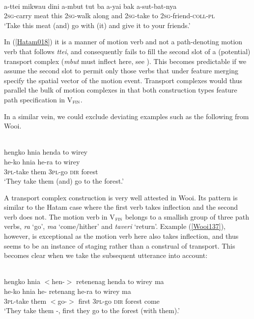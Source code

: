 \ea \label{Hatam018}
\\
\gll a-ttei mikwau dini a-mbut tut ba a-yai bak a-sut-bat-nya \\
\textsc{2}\textsc{sg}-carry meat this \textsc{2}\textsc{sg}-walk along and \textsc{2}\textsc{sg}-take to \textsc{2}\textsc{sg}-friend-\textsc{coll}-\textsc{pl} \\
\glft `Take this meat (and) go with (it) and give it to your friends.'\\ 
\z

In (\ref{Hatam018}) it is a manner of motion verb and not a path-denoting motion verb that follows \textit{ttei}, and consequently fails to fill the second slot of a (potential) transport complex (\textit{mbut} must inflect here, see \citealt[100]{reesink1999grammar}). This becomes predictable if we assume the second slot to permit only those verbs that under feature merging specify the spatial vector of the motion event. Transport complexes would thus parallel the bulk of motion complexes in that both construction types feature path specification in V$_{\textsc{fin}}$. 

In a similar vein, we could exclude deviating examples such as the following from Wooi.

\ea \label{Wooi137}
\\
\glll hengko hnia henda to wirey \\
he-ko hnia he-ra to wirey \\
\textsc{3}\textsc{pl}-take them \textsc{3}\textsc{pl}-go \textsc{dir} forest \\
\glft `They take them (and) go to the forest.'\\ 
\z

A transport complex construction is very well attested in Wooi. Its pattern is similar to the Hatam case where the first verb takes inflection and the second verb does not. The motion verb in V$_{\textsc{fin}}$ belongs to a smallish group of three path verbs, \textit{ra} `go', \textit{ma} `come/hither' and \textit{taveri} `return'. Example (\ref{Wooi137}), however, is exceptional as the motion verb here also takes inflection, and thus seems to be an instance of staging rather than a construal of transport. This becomes clear when we take the subsequent utterance into account:

\ea \label{Wooi137add}
\\
\glll hengko hnia $<$hen-$>$ retenenag henda to wirey ma \\
he-ko hnia he- retenang he-ra to wirey ma\\
\textsc{3}\textsc{pl}-take them $<$go-$>$ first \textsc{3}\textsc{pl}-go \textsc{dir} forest come \\
\glft `They take them -, first they go to the forest (with them).'\\
\z

